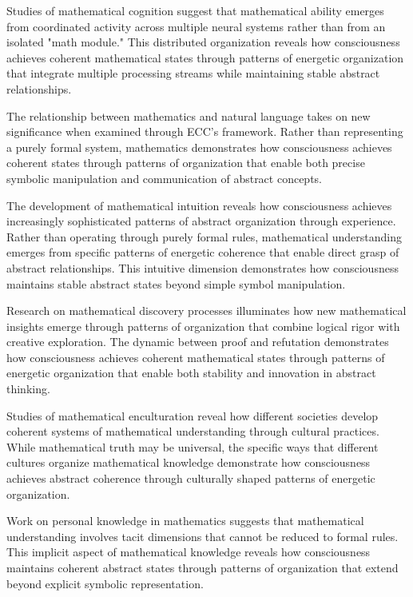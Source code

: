 Studies of mathematical cognition \cite{Devlin2000} suggest that mathematical ability emerges from coordinated activity across multiple neural systems rather than from an isolated "math module." This distributed organization reveals how consciousness achieves coherent mathematical states through patterns of energetic organization that integrate multiple processing streams while maintaining stable abstract relationships.

The relationship between mathematics and natural language \cite{MacLane1986} takes on new significance when examined through ECC's framework. Rather than representing a purely formal system, mathematics demonstrates how consciousness achieves coherent states through patterns of organization that enable both precise symbolic manipulation and communication of abstract concepts.

The development of mathematical intuition \cite{Penrose1994} reveals how consciousness achieves increasingly sophisticated patterns of abstract organization through experience. Rather than operating through purely formal rules, mathematical understanding emerges from specific patterns of energetic coherence that enable direct grasp of abstract relationships. This intuitive dimension demonstrates how consciousness maintains stable abstract states beyond simple symbol manipulation.

Research on mathematical discovery processes \cite{Lakatos1976} illuminates how new mathematical insights emerge through patterns of organization that combine logical rigor with creative exploration. The dynamic between proof and refutation demonstrates how consciousness achieves coherent mathematical states through patterns of energetic organization that enable both stability and innovation in abstract thinking.

Studies of mathematical enculturation \cite{Lloyd1990} reveal how different societies develop coherent systems of mathematical understanding through cultural practices. While mathematical truth may be universal, the specific ways that different cultures organize mathematical knowledge demonstrate how consciousness achieves abstract coherence through culturally shaped patterns of energetic organization.

Work on personal knowledge in mathematics \cite{Polanyi1958} suggests that mathematical understanding involves tacit dimensions that cannot be reduced to formal rules. This implicit aspect of mathematical knowledge reveals how consciousness maintains coherent abstract states through patterns of organization that extend beyond explicit symbolic representation.

